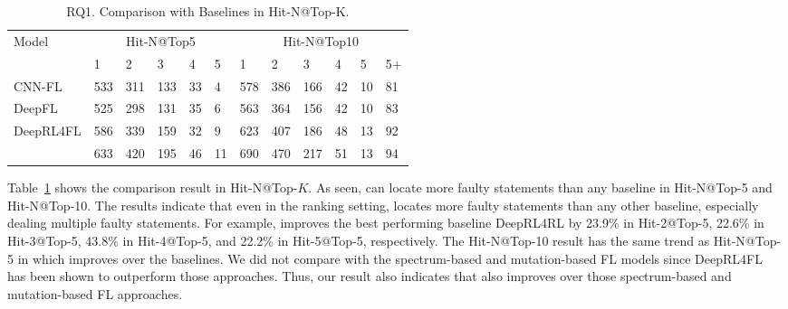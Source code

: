 \begin{table}[t]
	\caption{RQ1. Comparison with Baselines in Hit-N@Top-K.}
        \vspace{-6pt}
	{\small
		\begin{center}
			\renewcommand{\arraystretch}{1}
			\begin{tabular}{p{1.5cm}<{\centering}|p{0.3cm}<{\centering}|p{0.3cm}<{\centering}|p{0.3cm}<{\centering}|p{0.2cm}<{\centering}|p{0.2cm}<{\centering}|p{0.3cm}<{\centering}|p{0.3cm}<{\centering}|p{0.3cm}<{\centering}|p{0.2cm}<{\centering}|p{0.2cm}<{\centering}|p{0.2cm}<{\centering}}
				\hline
				\multirow{2}{*}{Model}    & \multicolumn{5}{c|}{Hit-N@Top5}& \multicolumn{6}{c}{Hit-N@Top10}\\
				\cline{2-12}
											 &1&2&3&4&5&1&2&3&4&5&5+\\
				
				\hline
				CNN-FL      & 533 & 311 & 133 & 33 & 4 & 578 & 386 & 166 & 42 & 10 & 81 \\
				DeepFL		& 525 & 298 & 131 & 35 & 6 & 563 & 364 & 156 & 42 & 10 & 83 \\
				DeepRL4FL	& 586 & 339 & 159 & 32 & 9 & 623 & 407 & 186 & 48 & 13 & 92 \\
				\hline
				\tool       & 633 & 420 & 195 & 46 & 11& 690 & 470 & 217 & 51 & 13 & 94 \\
				\hline
			\end{tabular}
			
			\label{fig:rq1-2}
		\end{center}
	}
\end{table}

Table~\ref{fig:rq1-2} shows the comparison result in Hit-N@Top-$K$.
As seen, {\tool} can locate more faulty statements than any baseline
in Hit-N@Top-5 and Hit-N@Top-10. The results indicate that even in the
ranking setting, {\tool} locates more faulty statements than
any other baseline, especially dealing multiple faulty statements. For
example, {\tool} improves the best performing baseline DeepRL4RL by
23.9\% in Hit-2@Top-5, 22.6\% in Hit-3@Top-5, 43.8\% in Hit-4@Top-5,
and 22.2\% in Hit-5@Top-5, respectively. The Hit-N@Top-10 result has
the same trend as Hit-N@Top-5 in which {\tool} improves over the
baselines. We did not compare with the spectrum-based and
mutation-based FL models since DeepRL4FL~\cite{icse21-fl} has been
shown to outperform those approaches. Thus, our result also indicates
that {\tool} also improves over those spectrum-based and
mutation-based FL approaches.
